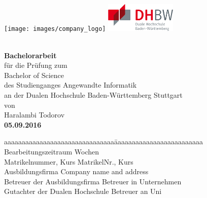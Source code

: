 \begin{titlepage}
    \texttt{[image: images/company\_logo]} %
    \hfill
    \includegraphics[height=40pt]{images/dhbw.png} %
    
    \enlargethispage{25mm}
    \begin{center}
        \vspace*{12mm}  {\LARGE\bf \titleLong} \\
        \vspace*{12mm}  {\LARGE\bf Bachelorarbeit}\\
        \vspace*{12mm}  für die Prüfung zum\\
        \vspace*{3mm}   {\large Bachelor of Science}\\
        \vspace*{12mm}  des Studienganges Angewandte Informatik\\
        \vspace*{3mm}   an der Dualen Hochschule Baden-Württemberg Stuttgart\\
        \vspace*{12mm}  von\\
        \vspace*{3mm}   {\large Haralambi Todorov}\\
        \vspace*{12mm}  {\large\bf 05.09.2016}
    \end{center}
    \vfill
    \begin{spacing}{1.5}
        \begin{tabbing}
			aaaaaaaaaaaaaaaaaaaaaaaaaaaaaaa\quad\= aaaaaaaaaaaaaaaaaaaaaaaaa\kill
            Bearbeitungszeitraum  Wochen\\
            Matrikelnummer, Kurs \> MatrikelNr., Kurs\\
            Ausbildungsfirma \> Company name and address\\
            Betreuer der Ausbildungsfirma \> Betreuer in Unternehmen\\
            Gutachter der Dualen Hochschule \> Betreuer an Uni\\
        \end{tabbing}
    \end{spacing}
\end{titlepage}